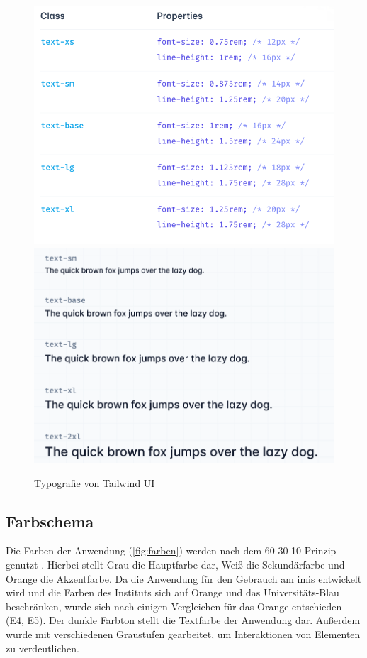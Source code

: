 \begin{figure}[h]
    \centering
    \includegraphics[scale=0.25]{Bilder/Prototyp/Screenshot 2022-09-27 at 15-07-24 Font Size - Tailwind CSS.png}
    \includegraphics[scale=0.25]{Bilder/Prototyp/Screenshot 2022-09-27 at 15-07-37 Font Size - Tailwind CSS.png}
    \caption{Typografie von Tailwind UI}
    \label{fig:schrift}
\end{figure}


\subsection{Farbschema}
Die Farben der Anwendung (\ref{fig:farben}) werden nach dem 60-30-10 Prinzip genutzt
\cite{experience_using}. Hierbei stellt Grau die Hauptfarbe dar, Weiß die Sekundärfarbe und Orange
die Akzentfarbe. Da die Anwendung für den Gebrauch am \ac{imis} entwickelt wird und die Farben des
Instituts sich auf Orange und das Universitäts-Blau beschränken, wurde sich nach einigen Vergleichen
für das Orange entschieden (E4, E5). Der dunkle Farbton stellt die Textfarbe der Anwendung dar. Außerdem
wurde mit verschiedenen Graustufen gearbeitet, um Interaktionen von Elementen zu verdeutlichen.

